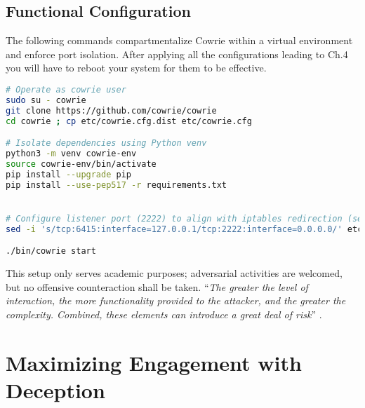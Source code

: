 \documentclass{cls/ULBreport}
\begin{document}
    \subsection{Functional Configuration}
    The following commands compartmentalize Cowrie within a virtual environment and enforce port isolation. After applying all the configurations leading to Ch.4 you will have to reboot your system for them to be effective.
    \begin{lstlisting}[language=bash,caption={Cowrie Honeypot Setup}]
# Operate as cowrie user
sudo su - cowrie  
git clone https://github.com/cowrie/cowrie  
cd cowrie ; cp etc/cowrie.cfg.dist etc/cowrie.cfg 

# Isolate dependencies using Python venv
python3 -m venv cowrie-env  
source cowrie-env/bin/activate  
pip install --upgrade pip
pip install --use-pep517 -r requirements.txt


# Configure listener port (2222) to align with iptables redirection (section 2.3)
sed -i 's/tcp:6415:interface=127.0.0.1/tcp:2222:interface=0.0.0.0/' etc/cowrie.cfg

./bin/cowrie start\end{lstlisting}



    \begin{tcolorbox}[  
        colback=red!5!white,  
        colframe=red!75!black,  
        title={\textbf{\textcolor{black}{Security Disclaimer}}},
        fontupper=\small,  
        sharp corners  
    ]  
    This setup only serves academic purposes; adversarial activities are welcomed, but no offensive counteraction shall be taken. \enquote{\textit{The greater the level of interaction, the more functionality provided to the attacker, and the greater the complexity. Combined, these elements can introduce a great deal of risk}} \autocite[Ch.~5, p.~91]{spitzner2002honeypots}.
    \end{tcolorbox}  
    


    \section{Maximizing Engagement with Deception}
\end{document}
